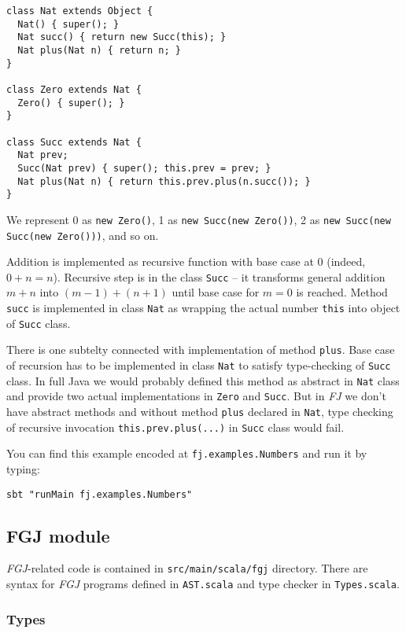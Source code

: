 \documentclass{article}[12pt]
\begin{document}
\begin{verbatim}
class Nat extends Object {
  Nat() { super(); }
  Nat succ() { return new Succ(this); }
  Nat plus(Nat n) { return n; }
}

class Zero extends Nat { 
  Zero() { super(); }
}

class Succ extends Nat {
  Nat prev;
  Succ(Nat prev) { super(); this.prev = prev; }
  Nat plus(Nat n) { return this.prev.plus(n.succ()); }
}
\end{verbatim}

We represent 0 as \texttt{new Zero()},
1 as \texttt{new Succ(new Zero())},
2 as \texttt{new Succ(new Succ(new Zero()))}, and so on.

Addition is implemented as recursive function with base case
at 0 (indeed, $0 + n = n$). Recursive step is in the class
\texttt{Succ} -- it transforms general addition $m + n$ into
$(m-1) + (n+1)$ until base case for $m = 0$ is reached.
Method \texttt{succ} is implemented in class \texttt{Nat} as
wrapping the actual number \texttt{this} into object of
\texttt{Succ} class.

There is one subtelty connected with implementation of method
\texttt{plus}. Base case of recursion has to be implemented in
class \texttt{Nat} to satisfy type-checking of \texttt{Succ}
class. In full Java we would probably defined this method as
abstract in \texttt{Nat} class and provide two actual
implementations in \texttt{Zero} and \texttt{Succ}. But in
\emph{FJ} we don't have abstract methods and without method
\texttt{plus} declared in \texttt{Nat}, type checking of
recursive invocation \texttt{this.prev.plus(...)} in
\texttt{Succ} class would fail.

You can find this example encoded at \texttt{fj.examples.Numbers}
and run it by typing:

\begin{verbatim}
sbt "runMain fj.examples.Numbers"
\end{verbatim}


\subsection{FGJ module}

\emph{FGJ}-related code is contained in \texttt{src/main/scala/fgj}
directory. There are syntax for \emph{FGJ} programs defined in
\texttt{AST.scala} and type checker in \texttt{Types.scala}.

\subsubsection{Types}
\end{document}
